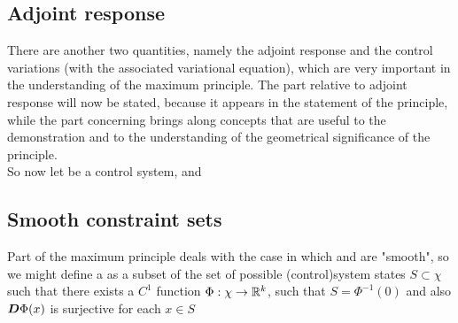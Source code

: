{{\subsection{Adjoint response}
There are another two quantities, namely the adjoint response and the control variations (with the associated variational equation), which are very important in the understanding of the maximum principle. The part relative to adjoint response will now be stated, because it appears in the statement of the principle, while the part concerning brings along concepts that are useful to the demonstration and to the understanding of the geometrical significance of the principle. \\
So now let \controlSystem be a control system, and 


\subsection{Smooth constraint sets}
Part of the maximum principle deals with the case in which \sz and \so are "smooth", so we might define a  as a subset of the set of possible (control)system states $S\subset\chi$ such that there exists a $C^1$ function $\Phi:\chi\rightarrow\mathbb{R}^k$, such that $S=\Phi^{-1}(0)$ and  also $\boldsymbol{D}\Phi(x)$ is surjective for each $x\in S$

}}
